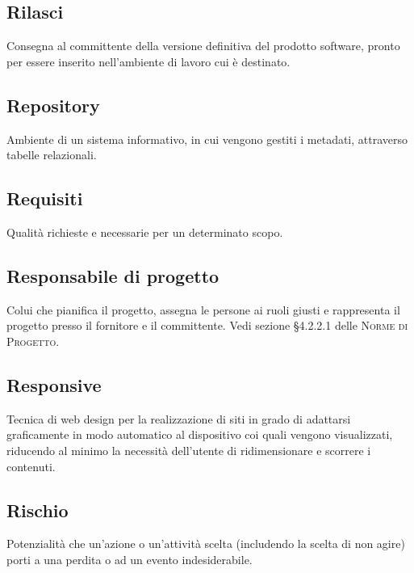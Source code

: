 \documentclass[../glossario.tex]{subfiles}
\begin{document}
\subsection*{Rilasci} 
Consegna al committente della versione definitiva del prodotto software, pronto per essere inserito nell’ambiente di lavoro cui è destinato. 


\subsection*{Repository} 
Ambiente di un sistema informativo, in cui vengono gestiti i metadati, attraverso tabelle relazionali.

\subsection*{Requisiti} 
Qualità richieste e necessarie per un determinato scopo.

\subsection*{Responsabile di progetto} 
Colui che pianifica il progetto, assegna le persone ai ruoli giusti e rappresenta il progetto presso il fornitore e il committente. Vedi sezione \S4.2.2.1 delle \textsc{Norme di Progetto}.

\subsection*{Responsive} 
Tecnica di web design per la realizzazione di siti in grado di adattarsi graficamente in modo automatico al dispositivo coi quali vengono visualizzati, riducendo al minimo la necessità dell'utente di ridimensionare e scorrere i contenuti.

\subsection*{Rischio} 
Potenzialità che un'azione o un'attività scelta (includendo la scelta di non agire) porti a una perdita o ad un evento indesiderabile.

    
\end{document}
